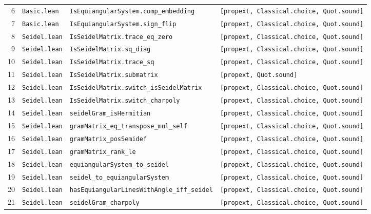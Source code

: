 \documentclass[11pt,reqno]{amsart}
\theoremstyle{definition}
\theoremstyle{remark}
\numberwithin{equation}{section}
\numberwithin{table}{section}
\begin{document}
{\begin{longtable}{@{}r>{\raggedright\arraybackslash}p{1.2in}>{\raggedright\arraybackslash}p{2.55in}>{\raggedright\arraybackslash}p{1.85in}@{}}
6 & \nolinkurl{Basic.lean} & \nolinkurl{IsEquiangularSystem.comp_embedding} & \texttt{[propext, Classical.choice, Quot.sound]} \\
7 & \nolinkurl{Basic.lean} & \nolinkurl{IsEquiangularSystem.sign_flip} & \texttt{[propext, Classical.choice, Quot.sound]} \\
8 & \nolinkurl{Seidel.lean} & \nolinkurl{IsSeidelMatrix.trace_eq_zero} & \texttt{[propext, Classical.choice, Quot.sound]} \\
9 & \nolinkurl{Seidel.lean} & \nolinkurl{IsSeidelMatrix.sq_diag} & \texttt{[propext, Classical.choice, Quot.sound]} \\
10 & \nolinkurl{Seidel.lean} & \nolinkurl{IsSeidelMatrix.trace_sq} & \texttt{[propext, Classical.choice, Quot.sound]} \\
11 & \nolinkurl{Seidel.lean} & \nolinkurl{IsSeidelMatrix.submatrix} & \texttt{[propext, Quot.sound]} \\
12 & \nolinkurl{Seidel.lean} & \nolinkurl{IsSeidelMatrix.switch_isSeidelMatrix} & \texttt{[propext, Classical.choice, Quot.sound]} \\
13 & \nolinkurl{Seidel.lean} & \nolinkurl{IsSeidelMatrix.switch_charpoly} & \texttt{[propext, Classical.choice, Quot.sound]} \\
14 & \nolinkurl{Seidel.lean} & \nolinkurl{seidelGram_isHermitian} & \texttt{[propext, Classical.choice, Quot.sound]} \\
15 & \nolinkurl{Seidel.lean} & \nolinkurl{gramMatrix_eq_transpose_mul_self} & \texttt{[propext, Classical.choice, Quot.sound]} \\
16 & \nolinkurl{Seidel.lean} & \nolinkurl{gramMatrix_posSemidef} & \texttt{[propext, Classical.choice, Quot.sound]} \\
17 & \nolinkurl{Seidel.lean} & \nolinkurl{gramMatrix_rank_le} & \texttt{[propext, Classical.choice, Quot.sound]} \\
18 & \nolinkurl{Seidel.lean} & \nolinkurl{equiangularSystem_to_seidel} & \texttt{[propext, Classical.choice, Quot.sound]} \\
19 & \nolinkurl{Seidel.lean} & \nolinkurl{seidel_to_equiangularSystem} & \texttt{[propext, Classical.choice, Quot.sound]} \\
20 & \nolinkurl{Seidel.lean} & \nolinkurl{hasEquiangularLinesWithAngle_iff_seidel} & \texttt{[propext, Classical.choice, Quot.sound]} \\
21 & \nolinkurl{Seidel.lean} & \nolinkurl{seidelGram_charpoly} & \texttt{[propext, Classical.choice, Quot.sound]} \\

\end{longtable}}
\end{document}
